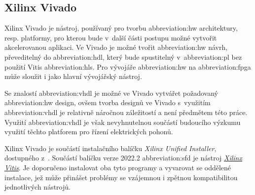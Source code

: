 \documentclass[a4paper, twoside, 11pt]{article}
\begin{document}
		\subsection{Xilinx Vivado}\label{subsec:xilinx-vivado}
			Xilinx Vivado je nástroj, používaný pro tvorbu \gls{abbreviation:hw} architektury, resp. platformy, pro kterou bude v~další části postupu možné vytvořit akcelerovanou aplikaci. Ve Vivado je možné tvořit \gls{abbreviation:hw} návrh, převeditelný do \gls{abbreviation:hdl}, který bude spustitelný v~\gls{abbreviation:pl} bez použití Vitis \gls{abbreviation:hls}. Pro vývojáře \gls{abbreviation:hw} na \gls{abbreviation:fpga} může sloužit i jako hlavní vývojářský nástroj.\par
			Se znalostí \gls{abbreviation:vhdl} je možné ve Vivado vytvářet požadovaný \gls{abbreviation:hw} design, ovšem tvorba designů ve Vivado s~využitím \gls{abbreviation:vhdl} je relativně náročnou záležitostí a není předmětem této práce. Využití \gls{abbreviation:vhdl} je však nevyhnutelnou součástí budoucího výzkumu využití těchto platforem pro řízení elektrických pohonů.\par
			Xilinx Vivado je součástí instalačního balíčku \textit{Xilinx Unified Installer}, dostupného z~\cite{xilinx-downloads}. Součástí balíčku verze 2022.2 \gls{abbreviation:sfd} je nástroj \hyperref[subsec:xilinx-vitis]{\textit{Xilinx Vitis}}. Je doporučeno instalovat oba tyto programy a vyvarovat se oddělené instalace, jež může přinášet problémy se vzájemnou i zpětnou kompatibilitou jednotlivých nástrojů.
\end{document}
